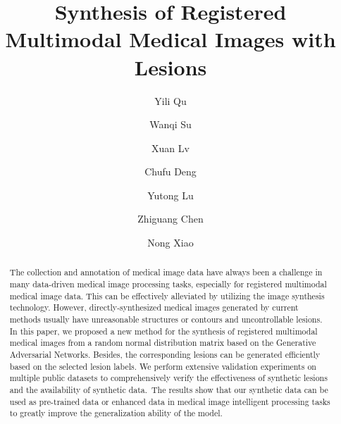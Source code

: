 \documentclass[runningheads]{llncs}
\begin{document}
	\title{Synthesis of Registered Multimodal
		Medical Images with Lesions}
	\author{ Yili Qu \and Wanqi Su \and Xuan Lv \and Chufu Deng 
		\and Yutong Lu \and Zhiguang Chen \and Nong Xiao}
	\maketitle       %
	\begin{abstract}
		The collection and annotation of medical image data have always been a challenge in many data-driven medical image processing tasks, especially for registered multimodal medical image data. This can be effectively alleviated by utilizing the image synthesis technology. However, directly-synthesized medical images generated by current methods usually have unreasonable structures or contours and uncontrollable lesions. In this paper, we proposed a new method for the synthesis of registered multimodal medical images from a random normal distribution matrix based on the Generative Adversarial Networks. Besides, the corresponding lesions can be generated efficiently based on the selected lesion labels. We perform extensive validation experiments on multiple public datasets to comprehensively verify the effectiveness of synthetic lesions and the availability of synthetic data. The results show that our synthetic data can be used as pre-trained data or enhanced data in medical image intelligent processing tasks to greatly improve the generalization ability of the model. 
		
	\end{abstract}
\end{document}
